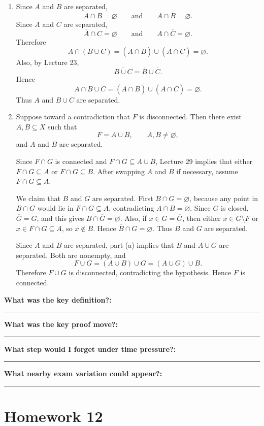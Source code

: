\documentclass[12pt]{article}
\newcommand{\closure}[1]{\overline{#1}}
\newcommand{\writespace}[1]{\vspace*{#1}}
\newcommand{\fillfieldbig}[2]{%
  \par\noindent\textbf{#1:}\par
  \writespace{#2}
  \noindent\rule{\linewidth}{0.35pt}\par\vspace{0.15in}%
}
\newenvironment{solutionbox}[1]{%
  \begin{tcolorbox}[
    enhanced,
    breakable,
    colback=solgreen,
    colframe=green!45!black,
    fonttitle=\bfseries,
    title={#1}
  ]
}{%
  \end{tcolorbox}
}
\newcommand{\reflectionpage}[1]{%
  \begin{tcolorbox}[
    enhanced,
    colback=reflectcyan,
    colframe=cyan!55!black,
    fonttitle=\bfseries,
    title={Reflection \& Variation\hfill #1},
    height=8.45in
  ]
  \fillfieldbig{What was the key definition?}{1.15in}
  \fillfieldbig{What was the key proof move?}{1.15in}
  \fillfieldbig{What step would I forget under time pressure?}{1.15in}
  \fillfieldbig{What nearby exam variation could appear?}{1.35in}
  \end{tcolorbox}
}
\begin{document}
\newpage
\begin{solutionbox}{Official Solution (Professor)}
\begin{enumerate}[label=(\alph*)]
  \item Since \(A\) and \(B\) are separated,
  \[
    \closure{A}\cap B=\varnothing
    \qquad\text{and}\qquad
    A\cap\closure{B}=\varnothing.
  \]
  Since \(A\) and \(C\) are separated,
  \[
    \closure{A}\cap C=\varnothing
    \qquad\text{and}\qquad
    A\cap\closure{C}=\varnothing.
  \]
  Therefore
  \[
    \closure{A}\cap(B\cup C)
    =
    (\closure{A}\cap B)\cup(\closure{A}\cap C)
    =
    \varnothing.
  \]
  Also, by Lecture 23,
  \[
    \closure{B\cup C}=\closure{B}\cup\closure{C}.
  \]
  Hence
  \[
    A\cap\closure{B\cup C}
    =
    (A\cap\closure{B})\cup(A\cap\closure{C})
    =
    \varnothing.
  \]
  Thus \(A\) and \(B\cup C\) are separated.

  \item Suppose toward a contradiction that \(F\) is disconnected. Then there exist \(A,B\subseteq X\) such that
  \[
    F=A\cup B,
    \qquad
    A,B\neq\varnothing,
  \]
  and \(A\) and \(B\) are separated.

  Since \(F\cap G\) is connected and \(F\cap G\subseteq A\cup B\), Lecture 29 implies that either \(F\cap G\subseteq A\) or \(F\cap G\subseteq B\). After swapping \(A\) and \(B\) if necessary, assume \(F\cap G\subseteq A\).

  We claim that \(B\) and \(G\) are separated. First \(B\cap G=\varnothing\), because any point in \(B\cap G\) would lie in \(F\cap G\subseteq A\), contradicting \(A\cap B=\varnothing\). Since \(G\) is closed, \(\closure{G}=G\), and this gives \(B\cap\closure{G}=\varnothing\). Also, if \(x\in G=\closure{G}\), then either \(x\in G\setminus F\) or \(x\in F\cap G\subseteq A\), so \(x\notin B\). Hence \(\closure{B}\cap G=\varnothing\). Thus \(B\) and \(G\) are separated.

  Since \(A\) and \(B\) are separated, part (a) implies that \(B\) and \(A\cup G\) are separated. Both are nonempty, and
  \[
    F\cup G=(A\cup B)\cup G=(A\cup G)\cup B.
  \]
  Therefore \(F\cup G\) is disconnected, contradicting the hypothesis. Hence \(F\) is connected.
\end{enumerate}
\end{solutionbox}

\newpage
\reflectionpage{Homework 11, Problem 6}

\newpage
\section{Homework 12}
\end{document}
